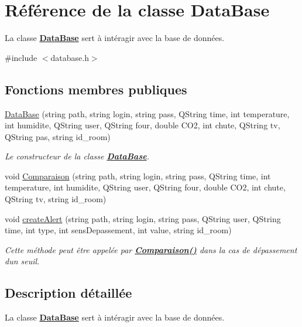\hypertarget{classDataBase}{}\section{Référence de la classe Data\+Base}
\label{classDataBase}


La classe {\bfseries \hyperlink{classDataBase}{Data\+Base}} sert à intéragir avec la base de données.  




{\ttfamily \#include $<$database.\+h$>$}

\subsection*{Fonctions membres publiques}
\begin{DoxyCompactItemize}
\item 
\hyperlink{classDataBase_a58bcabfc07dc77eb0fc35d27523f3e9f}{Data\+Base} (string path, string login, string pass, Q\+String time, int temperature, int humidite, Q\+String user, Q\+String four, double C\+O2, int chute, Q\+String tv, Q\+String pas, string id\+\_\+room)
\begin{DoxyCompactList}\small\item\em Le constructeur de la classe {\bfseries \hyperlink{classDataBase}{Data\+Base}}. \end{DoxyCompactList}\item 
void \hyperlink{classDataBase_a65ad879d829e20db4a78719e62c8356e}{Comparaison} (string path, string login, string pass, Q\+String time, int temperature, int humidite, Q\+String user, Q\+String four, double C\+O2, int chute, Q\+String tv, string id\+\_\+room)
\item 
void \hyperlink{classDataBase_aa1c151b2f7d0adb2a2a7a692db65e3f4}{create\+Alert} (string path, string login, string pass, Q\+String user, Q\+String time, int type, int sens\+Depassement, int value, string id\+\_\+room)
\begin{DoxyCompactList}\small\item\em Cette méthode peut être appelée par {\bfseries \hyperlink{classDataBase_a65ad879d829e20db4a78719e62c8356e}{Comparaison()}} dans la cas de dépassement d\textquotesingle{}un seuil. \end{DoxyCompactList}\end{DoxyCompactItemize}


\subsection{Description détaillée}
La classe {\bfseries \hyperlink{classDataBase}{Data\+Base}} sert à intéragir avec la base de données. 

